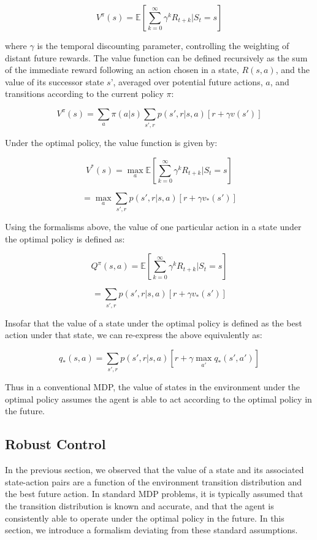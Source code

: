 \documentclass[11pt]{article} %
\begin{document}
$$ V^\pi(s) = \mathbb{E} \left[ \sum^{\infty}_{k=0} \gamma^k R_{t+k} | S_t = s \right] $$

where $\gamma$ is the temporal discounting parameter, controlling the weighting
of distant future rewards. The value function can be defined recursively as the
sum of the immediate reward following an action chosen in a state, $R(s, a)$, and
the value of its successor state $s’$, averaged over potential future actions, $a$,
and transitions according to the current policy $\pi$:

$$ V^\pi(s) = \sum_a \pi(a|s) \sum_{s',r}p(s',r|s,a) \left[ r + \gamma v(s') \right] $$

Under the optimal policy, the value function is given by:

$$ V^*(s) = \max_a \mathbb{E} \left[ \sum^{\infty}_{k=0} \gamma^k R_{t+k} | S_t = s \right] $$

$$ = \max_a \sum_{s',r}p(s',r|s,a) \left[ r + \gamma v_*(s') \right] $$

Using the formalisms above, the value of one particular action in a state under
the optimal policy is defined as:

$$ Q^\pi(s,a) = \mathbb{E} \left[ \sum^{\infty}_{k=0} \gamma^k R_{t+k} | S_t = s \right] $$

$$ = \sum_{s',r}p(s',r|s,a) \left[ r + \gamma v_*(s') \right] $$

Insofar that the value of a state under the optimal policy is defined as the best
action under that state, we can re-express the above equivalently as:

$$ q_*(s,a) = \sum_{s',r}p(s',r|s,a) \left[ r + \gamma \max_{a'} q_*(s',a') \right] $$

Thus in a conventional MDP, the value of states in the environment under the optimal
policy assumes the agent is able to act according to the optimal policy in the future.

\subsection{Robust Control}
In the previous section, we observed that the value of a state and its associated
state-action pairs are a function of the environment transition distribution and
the best future action. In standard MDP problems, it is typically assumed that the
transition distribution is known and accurate, and that the agent is consistently
able to operate under the optimal policy in the future. In this section, we introduce
a formalism deviating from these standard assumptions.
\end{document}
